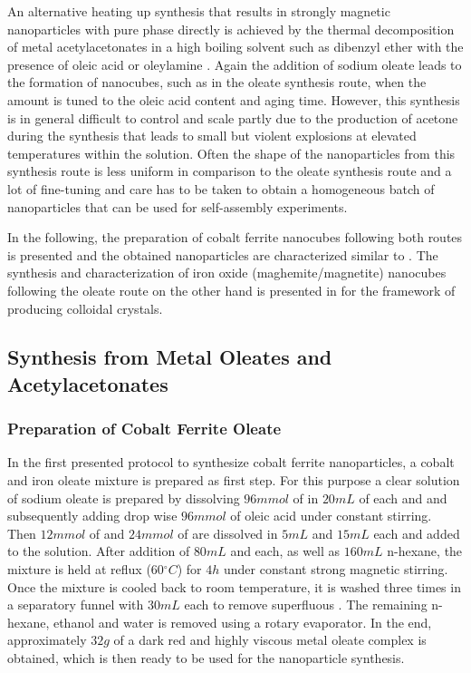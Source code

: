 \documentclass[\main/dresen_thesis.tex]{subfiles}
\begin{document}
  An alternative heating up synthesis that results in strongly magnetic nanoparticles with pure phase directly is achieved by the thermal decomposition of metal acetylacetonates in a high boiling solvent such as dibenzyl ether with the presence of oleic acid or oleylamine \cite{Sun_2002_SizeC, Wu_2014_Monol}.
  Again the addition of sodium oleate leads to the formation of nanocubes, such as in the oleate synthesis route, when the amount is tuned to the oleic acid content and aging time.
  However, this synthesis is in general difficult to control and scale partly due to the production of acetone during the synthesis that leads to small but violent explosions at elevated temperatures within the solution.
  Often the shape of the nanoparticles from this synthesis route is less uniform in comparison to the oleate synthesis route and a lot of fine-tuning and care has to be taken to obtain a homogeneous batch of nanoparticles that can be used for self-assembly experiments.

  In the following, the preparation of cobalt ferrite nanocubes following both routes is presented and the obtained nanoparticles are characterized similar to .
  The synthesis and characterization of iron oxide (maghemite/magnetite) nanocubes following the oleate route on the other hand is presented in  for the framework of producing colloidal crystals.

  \subsection{Synthesis from Metal Oleates and Acetylacetonates}\label{sec:monolayers:nanoparticle:synthesisOleatesAcAc}
    \subsubsection{Preparation of Cobalt Ferrite Oleate}
      In the first presented protocol to synthesize cobalt ferrite nanoparticles, a cobalt and iron oleate mixture is prepared as first step.
      For this purpose a clear solution of sodium oleate is prepared by dissolving $96 \unit{mmol}$ of  in $20 \unit{mL}$ of each  and  and subsequently adding drop wise $96 \unit{mmol}$ of oleic acid under constant stirring.
      Then $12 \unit{mmol}$ of  and $24 \unit{mmol}$ of  are dissolved in $5 \unit{mL}$  and $15 \unit{mL}$  each and added to the solution.
      After addition of $80 \unit{mL}$  and  each, as well as $160 \unit{mL}$ n-hexane, the mixture is held at reflux ($60 \unit{^\circ C}$) for $4 \unit{h}$ under constant strong magnetic stirring.
      Once the mixture is cooled back to room temperature, it is washed three times in a separatory funnel with $30 \unit{mL}$  each to remove superfluous .
      The remaining n-hexane, ethanol and water is removed using a rotary evaporator.
      In the end, approximately $32 \unit{g}$ of a dark red and highly viscous metal oleate complex is obtained, which is then ready to be used for the nanoparticle synthesis.
\end{document}
